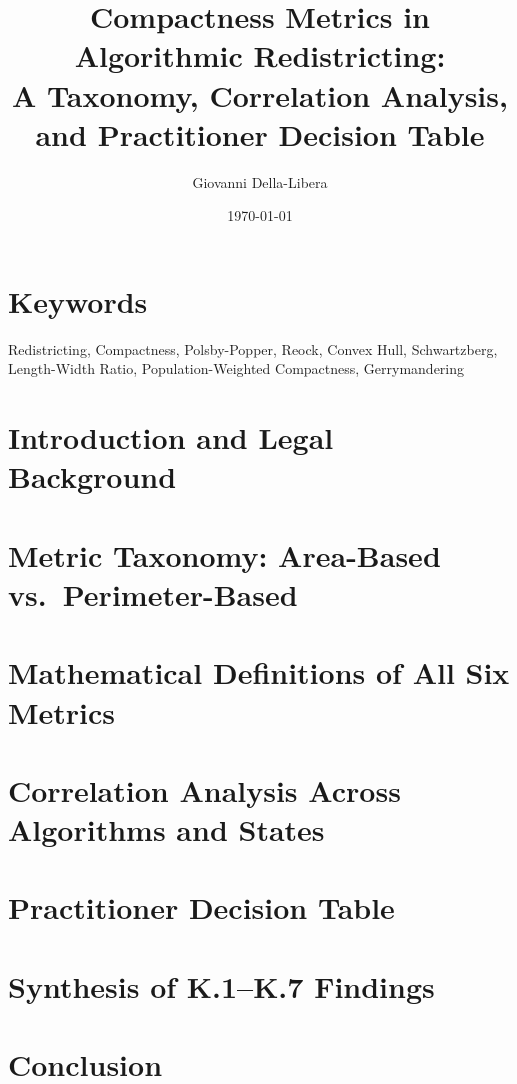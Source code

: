 \documentclass[12pt]{article}
\title{\textbf{Compactness Metrics in Algorithmic Redistricting:\\
A Taxonomy, Correlation Analysis, and Practitioner Decision Table}}
\author{Giovanni Della-Libera}
\date{\today}
\begin{document}
\maketitle

\begin{abstract}

\end{abstract}

\section*{Keywords}
Redistricting, Compactness, Polsby-Popper, Reock, Convex Hull, Schwartzberg,
Length-Width Ratio, Population-Weighted Compactness, Gerrymandering

\section{Introduction and Legal Background}


\section{Metric Taxonomy: Area-Based vs.\ Perimeter-Based}


\section{Mathematical Definitions of All Six Metrics}


\section{Correlation Analysis Across Algorithms and States}


\section{Practitioner Decision Table}


\section{Synthesis of K.1--K.7 Findings}


\section{Conclusion}




\end{document}
